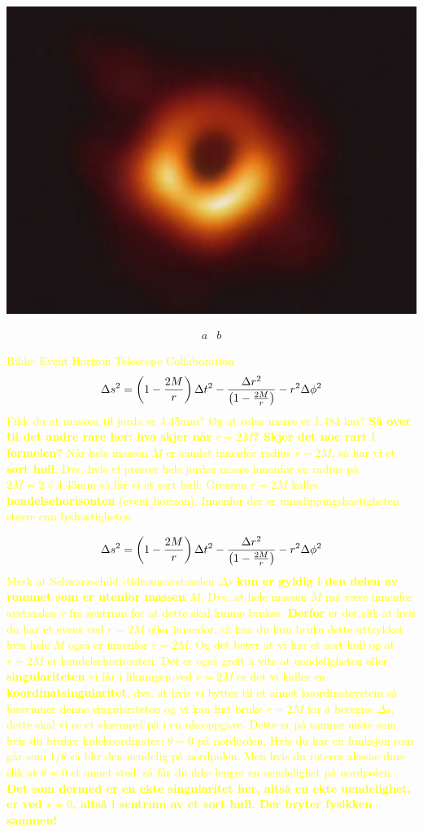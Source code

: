 \documentclass{beamer}
\renewcommand{\ss}{Schwarz\-schild }
\newcommand{\pagebutton}[1]{\setbeamertemplate{button}{\tikz\node[inner xsep = 5pt, draw = structure!90, fill = green(ryb), rounded corners = 8pt]{\color{amber}\Large\insertbuttontext};}\beamerbutton{#1}}
\begin{document}
\begin{frame}
{{{\centerline{\includegraphics[scale=0.08]{media/bh.jpg}}
{\Large
\begin{align*}
a&b
\end{align*}
}}}
\textcolor{yellow}{
{\tiny Bilde: Event Horizon Telescope Collaboration}\\
\footnotesize
\[
\Delta s^2=\left(1-\frac{2M}{r}\right)\Delta t^2-\frac{\Delta r^2}{\left(1-\frac{2M}{r}\right)}-r^2\Delta\phi^2
\]
Fikk du at massen til jorda er 4.45mm? Og at solas masse er 1.484 km? {\bf Så over til det andre rare her: hva skjer når $r=2M$? Skjer det noe rart i formelen?} Når hele massen $M$ er samlet innenfor radius $r=2M$, så har vi et {\bf sort hull}. Dvs. hvis vi presser hele jordas masse innenfor en radius på $2M=2\times4.45\mathrm{mm}$ så får vi et sort hull. Grensen $r=2M$ kalles {\bf hendelsehorisonten} (event horizon). Innenfor der er unnslippingshastigheten større enn lyshastigheten.
}
\hyperlink{feil_ss16}{\pagebutton{SIDE 16/18/73}}}


{
\textcolor{yellow}{
\footnotesize
\[
\Delta s^2=\left(1-\frac{2M}{r}\right)\Delta t^2-\frac{\Delta r^2}{\left(1-\frac{2M}{r}\right)}-r^2\Delta\phi^2
\]
Merk at \ss-tidromsavstanden $\Delta s$ {\bf kun er gyldig i den delen av rommet som er utenfor massen $M$}. Dvs. at hele massen $M$ må være innenfor avstanden $r$ fra sentrum for at dette skal kunne brukes. {\bf Derfor} er det slik at hvis du har et event ved $r=2M$ eller innenfor, så kan du kun bruke dette uttrykket hvis hele $M$ også er innenfor $r=2M$. Og det betyr at vi har et sort hull og at $r=2M$ er hendelsehorisonten. Det er også greit å vite at uendeligheten eller {\bf singulariteten} vi får i likningen ved $r=2M$ er det vi kaller en {\bf koordinatsingularitet}, dvs. at hvis vi bytter til et annet koordinatsystem så forsvinner denne singulariteten og vi kan fint bruke $r=2M$ for å beregne $\Delta s$, dette skal vi se et eksempel på i en ukeoppgave. Dette er på samme måte som hvis du bruker kulekoordinater: $\theta=0$ på nordpolen. Hvis du har en funksjon som går som $1/\theta$ så blir den uendelig på nordpolen. Men hvis du roterer aksene dine slik at $\theta=0$ et annet sted, så får du ikke lenger en uendelighet på nordpolen. {\bf Det som dermed er en ekte singularitet her, altså en ekte uendelighet, er ved $r=0$, altså i sentrum av et sort hull. Der bryter fysikken sammen!}
}
\hyperlink{feil_ss17}{\pagebutton{SIDE 17/18/73}}}


\end{frame}
\end{document}
